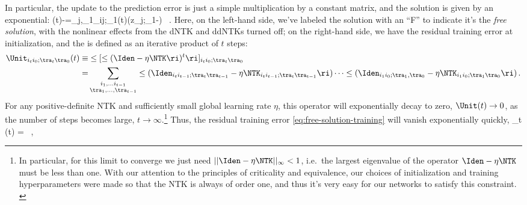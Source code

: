 In particular, the update to the prediction error is just a simple multiplication by a constant matrix, and the solution is given by an exponential:
\be\label{eq:free-solution-training}
(t)-=\sum_{j,\tra_1}\Unit_{ij;\tra\tra_1}\!(t)\le(z_{j;\tra_1}-\ri) \, .
\ee
Here, on the left-hand side, we've labeled the solution with an ``F'' to indicate it's the \emph{free solution}, with the nonlinear effects from the dNTK and ddNTKs turned off; on the right-hand side, we have the residual training error at initialization, and the  is defined as an iterative product of $t$ steps:
\begin{align}\label{eq:unitary-operator-at-least-in-continuum-limit-with-imaginary-time}
\Unit_{i_t i_0;\tra_t\tra_0}(t)\equiv&\le[\le(\Iden-\eta\NTK\ri)^t\ri]_{i_ti_0;\tra_t\tra_0}\, \\
=&\sum_{\substack{i_1,\ldots i_{t-1}\\ \tra_1,\ldots,\tra_{t-1}}}\le(\Iden_{i_t i_{t-1};\tra_t\tra_{t-1}}-\eta\NTK_{i_t i_{t-1};\tra_{t}\tra_{t-1}}\ri)\cdots\le(\Iden_{i_1 i_0;\tra_1,\tra_0}-\eta\NTK_{i_1 i_0;\tra_1\tra_0}\ri)\, .\notag
\end{align}
For any positive-definite NTK and sufficiently small global learning rate $\eta$, this operator will exponentially decay to zero, $\Unit(t)\to 0$, as the number of steps becomes large, $t\to\infty$.\footnote{
    In particular, for this limit to converge we just need $ ||\Iden-\eta \NTK||_\infty < 1$, i.e.~the largest eigenvalue of the operator $\Iden-\eta \NTK$  must be less than one. With our attention to the principles of criticality and equivalence, our choices of initialization and training hyperparameters were made so that the NTK is always of order one, and thus it's very easy for our networks to satisfy this constraint. \label{footnote:convergence-dynamics}
} 
Thus, the residual training error \eqref{eq:free-solution-training} will vanish exponentially quickly, 
\be\label{eq:free-training-converges}
\lim_{t\to\infty} (t) =  \, ,
\ee

